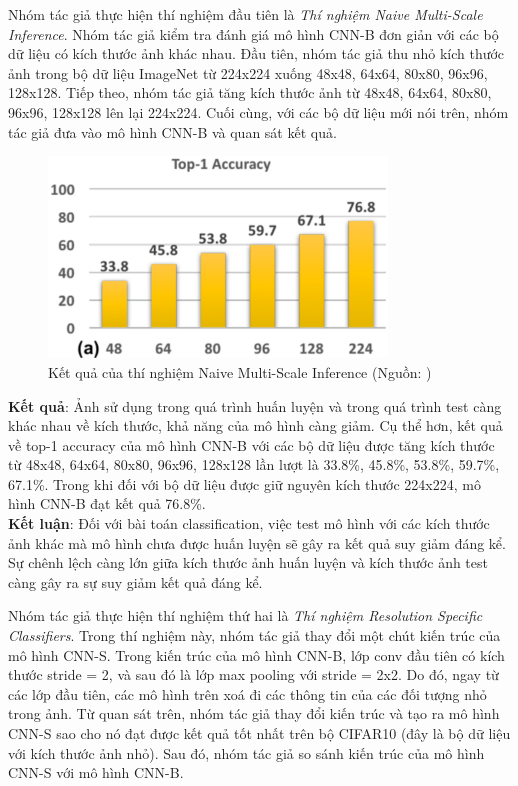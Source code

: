 {    \noindent 
    Nhóm tác giả thực hiện thí nghiệm đầu tiên là \textit{Thí nghiệm Naive Multi-Scale Inference}.
    Nhóm tác giả kiểm tra đánh giá mô hình CNN-B đơn giản với các bộ dữ liệu có kích thước ảnh khác nhau.
    Đầu tiên, nhóm tác giả thu nhỏ kích thước ảnh trong bộ dữ liệu ImageNet từ 224x224 xuống 48x48, 64x64, 80x80, 96x96, 128x128.
    Tiếp theo, nhóm tác giả tăng kích thước ảnh từ 48x48, 64x64, 80x80, 96x96, 128x128 lên lại 224x224.
    Cuối cùng, với các bộ dữ liệu mới nói trên, nhóm tác giả đưa vào mô hình CNN-B và quan sát kết quả.

    \begin{figure}[H]
        \centering
        \includegraphics[width=9cm] {images/snip_naive_multi_scale_infer}
        \caption{Kết quả của thí nghiệm Naive Multi-Scale Inference (Nguồn: \cite{singh2018analysis})}
        \label{fig:snip_naive_multi_scale_infer}
    \end{figure}

    \noindent
    \textbf{Kết quả}:
    Ảnh sử dụng trong quá trình huấn luyện và trong quá trình test càng khác nhau về kích thước, khả năng của mô hình càng giảm.
    Cụ thể hơn, kết quả về top-1 accuracy của mô hình CNN-B với các bộ dữ liệu được tăng kích thước từ 48x48, 64x64, 80x80, 96x96, 128x128 lần lượt là 33.8\%, 45.8\%, 53.8\%, 59.7\%, 67.1\%.
    Trong khi đối với bộ dữ liệu được giữ nguyên kích thước 224x224, mô hình CNN-B đạt kết quả 76.8\%. \\
    \textbf{Kết luận}:
    Đối với bài toán classification, việc test mô hình với các kích thước ảnh khác mà mô hình chưa được huấn luyện sẽ gây ra kết quả suy giảm đáng kể.
    Sự chênh lệch càng lớn giữa kích thước ảnh huấn luyện và kích thước ảnh test càng gây ra sự suy giảm kết quả đáng kể.

    \noindent
    Nhóm tác giả thực hiện thí nghiệm thứ hai là \textit{Thí nghiệm Resolution Specific Classifiers}.
    Trong thí nghiệm này, nhóm tác giả thay đổi một chút kiến trúc của mô hình CNN-S.
    Trong kiến trúc của mô hình CNN-B, lớp conv đầu tiên có kích thước stride = 2, và sau đó là lớp max pooling với stride = 2x2.
    Do đó, ngay từ các lớp đầu tiên, các mô hình trên xoá đi các thông tin của các đối tượng nhỏ trong ảnh.
    Từ quan sát trên, nhóm tác giả thay đổi kiến trúc và tạo ra mô hình CNN-S sao cho nó đạt được kết quả tốt nhất trên bộ CIFAR10 (đây là bộ dữ liệu với kích thước ảnh nhỏ).
    Sau đó, nhóm tác giả so sánh kiến trúc của mô hình CNN-S với mô hình CNN-B.

}

